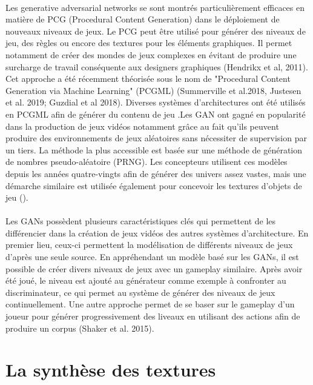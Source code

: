 \documentclass[a4paper,11pt]{article} %
\begin{document}
\paragraph{
}
Les generative adversarial networks se sont montrés particulièrement efficaces en matière de PCG (Procedural Content Generation) dans le déploiement de nouveaux niveaux de jeux. Le PCG peut être utilisé pour générer des niveaux de jeu, des règles ou encore des textures pour les éléments graphiques. Il permet notamment de créer des mondes de jeux complexes en évitant de produire une surcharge de travail conséquente aux designers graphiques (Hendrikx et al, 2011). Cet approche a été récemment théorisée sous le nom de "Procedural Content Generation via Machine Learning" (PCGML) (Summerville et al.2018, Justesen et al. 2019; Guzdial et al 2018). Diverses systèmes d'architectures ont été utilisés en PCGML afin de générer du contenu de jeu .Les GAN ont gagné en popularité dans la production de jeux vidéos notamment grâce au fait qu'ils peuvent produire des environnements de jeux aléatoires sans nécessiter de supervision par un tiers. La méthode la plus accessible est basée sur une méthode de génération de nombres pseudo-aléatoire (PRNG). Les concepteurs utilisent ces modèles depuis les années quatre-vingts afin de générer des univers assez vastes, mais une démarche similaire est utilisée également pour concevoir les textures d'objets de jeu (\citeauthor{kumaran_generating_2020}). 

\paragraph{
}
Les GANs possèdent plusieurs caractéristiques clés qui permettent de les différencier dans la création de jeux vidéos des autres systèmes d'architecture. En premier lieu, ceux-ci permettent la modélisation de différents niveaux de jeux d'après une seule source. En appréhendant un modèle basé sur les GANs, il est possible de créer divers niveaux de jeux avec un gameplay similaire. Après avoir été joué, le niveau est ajouté au générateur comme exemple à confronter au discriminateur, ce qui permet au système de générer des niveaux de jeux continuellement. Une autre approche permet de se baser sur le gameplay d'un joueur pour générer progressivement des liveaux en utilisant des actions afin de produire un corpus (Shaker et al. 2015). 

\section{La synthèse des textures}
\end{document}
